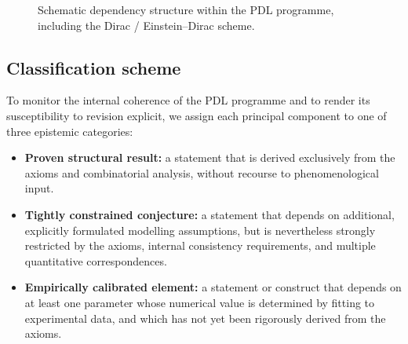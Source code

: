 \documentclass{article}
\begin{document}
\begin{figure}[H]
  \caption{Schematic dependency structure within the PDL programme, including the Dirac / Einstein--Dirac scheme.}
  \label{fig:pdl_dependency}
\end{figure}


\subsection{Classification scheme}
\label{subsec:classification_scheme}

To monitor the internal coherence of the PDL programme and to render its susceptibility to revision explicit, we assign each principal component to one of three epistemic categories:
\begin{itemize}[leftmargin=1.5em]
  \item \textbf{Proven structural result:} a statement that is derived exclusively from the axioms and combinatorial analysis, without recourse to phenomenological input.
  \item \textbf{Tightly constrained conjecture:} a statement that depends on additional, explicitly formulated modelling assumptions, but is nevertheless strongly restricted by the axioms, internal consistency requirements, and multiple quantitative correspondences.
  \item \textbf{Empirically calibrated element:} a statement or construct that depends on at least one parameter whose numerical value is determined by fitting to experimental data, and which has not yet been rigorously derived from the axioms.
\end{itemize}
\end{document}
